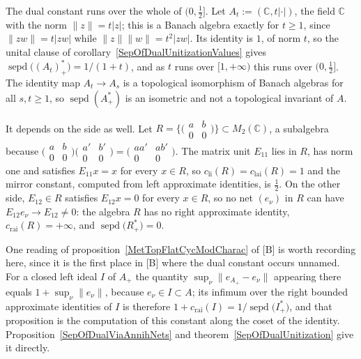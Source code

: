 \documentclass[11pt]{article}
\theoremstyle{plain}
\theoremstyle{definition}
\DeclareMathOperator{\sepd}{sepd}
\newcommand{\cli}{c_{\mathrm{li}}}
\newcommand{\crai}{c_{\mathrm{rai}}}
\newcommand{\clai}{c_{\mathrm{lai}}}
\begin{document}
The dual constant runs over the whole of $(0,\tfrac{1}{2}]$. Let
$A_t:=(\mathbb{C},t|\cdot|)$, the field $\mathbb{C}$ with the norm
$\lVert z\rVert=t|z|$; this is a Banach algebra exactly for $t\geq 1$, since
$\lVert zw\rVert=t|zw|$ while $\lVert z\rVert\lVert w\rVert=t^2|zw|$. Its
identity is $1$, of norm $t$, so the unital clause of
corollary~\ref{SepOfDualUnitizationValues} gives
$\sepd \bigl({(A_t)}_+^* \bigr)=1/(1+t)$, and as $t$ runs over $[1,+\infty)$ this
runs over $(0,\tfrac{1}{2}]$. The identity map $A_t\to A_s$ is a topological
isomorphism of Banach algebras for all $s,t\geq 1$, so $\sepd(A_+^*)$ is an
isometric and not a topological invariant of $A$.

It depends on the side as well. Let
$R= \bigl\{ \bigl(\begin{smallmatrix}a&b\\0&0\end{smallmatrix} \bigr) \bigr\}
\subset M_2(\mathbb{C})$, a subalgebra because
$\bigl(\begin{smallmatrix}a&b\\0&0\end{smallmatrix} \bigr)
\bigl(\begin{smallmatrix}a'&b'\\0&0\end{smallmatrix} \bigr)
=\bigl(\begin{smallmatrix}aa'&ab'\\0&0\end{smallmatrix} \bigr)$. The matrix unit
$E_{11}$ lies in $R$, has norm one and satisfies $E_{11}x=x$ for every $x\in R$,
so $\cli(R)=\clai(R)=1$ and the mirror constant, computed from left approximate
identities, is $\tfrac{1}{2}$. On the other side, $E_{12}\in R$ satisfies
$E_{12}x=0$ for every $x\in R$, so no net ${(e_\nu)}$ in $R$ can have
$E_{12}e_\nu\to E_{12}\neq 0$: the algebra $R$ has no right approximate identity,
$\crai(R)=+\infty$, and $\sepd \bigl(R_+^* \bigr)=0$.

One reading of proposition~\ref{MetTopFlatCycModCharac} of [B] is worth
recording here, since it is the first place in [B] where the dual constant
occurs unnamed. For a closed left ideal $I$ of $A_+$ the quantity
$\sup_\nu\lVert e_{A_+}-e_\nu\rVert$ appearing there equals
$1+\sup_\nu\lVert e_\nu\rVert$, because $e_\nu\in I\subset A$; its infimum over
the right bounded approximate identities of $I$ is therefore
$1+\crai(I)=1/\sepd \bigl(I_+^* \bigr)$, and that proposition is the computation
of this constant along the coset of the identity.
Proposition~\ref{SepOfDualViaAnnihNets} and
theorem~\ref{SepOfDualUnitization} give it directly.
\end{document}
